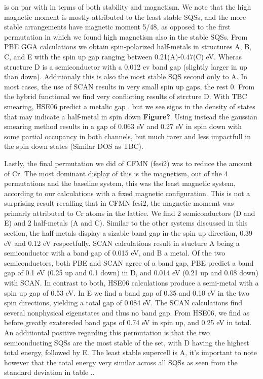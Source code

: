  is on par with  in terms of both stability and magnetism. We note that the high magnetic moment is mostly attributed to the least stable SQSs, and the more stable arrangements have magnetic moment 5/48, as opposed to the first permutation in which we found high magnetism also in the stable SQSs. From PBE GGA calculations we obtain spin-polarized half-metals in structures A, B, C, and E with the spin up gap ranging between 0.21(A)-0.47(C) eV. Wheras structure D is a semiconductor with a 0.012 ev band gap (slightly larger in up than down). Additionaly this is also the most stable SQS second only to A. In most cases, the use of SCAN results in very small spin up gaps, the rest 0. From the hybrid functional we find very conflicting results of strcture D. With TBC smearing, HSE06 predict a metalic gap , but  we see signs in the density of states that may indicate a half-metal in spin down \textbf{Figure?}. Using instead the gaussian smearing method results in a gap of 0.063 eV and 0.27 eV in spin down with some partial occupancy in both channels, but much rarer and less impactfull in the spin down states (Similar DOS as TBC).        

Lastly, the final permutation we did of CFMN (fesi2) was to reduce the amount of Cr. The most dominant display of this is the magnetism, out of the 4 permutations and the baseline system, this was the least magnetic system, according to our calculations with a fixed magnetic configuration. This is not a surprising result recalling that in CFMN fesi2, the magnetic momemt was primarly attributed to Cr atoms in the lattice. We find 2 semiconductors (D and E) and 2 half-metals (A and C). Similar to the other systems discussed in this section, the half-metals display a sizable band gap in the spin up direction, 0.39 eV and 0.12 eV respectfully. SCAN calculations result in stucture A being a semiconductor with a band gap of 0.015 eV, and B a metal. Of the two semiconductors, both PBE and SCAN agree of a band gap, PBE predict a band gap of 0.1 eV (0.25 up and 0.1 down) in D, and 0.014 eV (0.21 up and 0.08 down) with SCAN. In contrast to both, HSE06 calculations produce a semi-metal with a spin up gap of 0.53 eV. In E we find a band gap of 0.35 and 0.10 eV in the two spin directions, yielding a total gap of 0.084 eV. The SCAN calculations find several nonphysical eigenstates and thus no band gap. From HSE06, we find as before greatly exatereded band gaps of 0.74 eV in spin up, and 0.25 eV in total. An additiontal positive regarding this permutation is that the two semiconducting SQSs are the most stable of the set, with D having the highest total energy, followed by E. The least stable supercell is A, it's important to note however that the total energy very similar across all SQSs as seen from the standard deviation in table .. 

